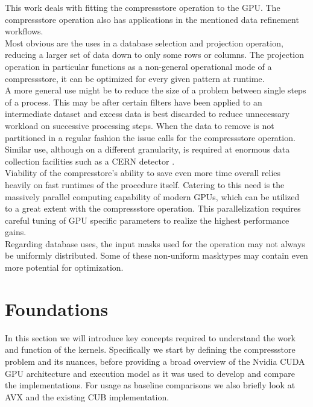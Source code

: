 \documentclass{tudscrreprt}
\begin{document}
		This work deals with fitting the compressstore operation to the GPU. The compressstore operation also has applications in the mentioned data refinement workflows. \\
		
		Most obvious are the uses in a database selection and projection operation, reducing a larger set of data down to only some rows or columns. The projection operation in particular functions as a non-general operational mode of a compressstore, it can be optimized for every given pattern at runtime. \\
		A more general use might be to reduce the size of a problem between single steps of a process. This may be after certain filters have been applied to an intermediate dataset and excess data is best discarded to reduce unnecessary workload on successive processing steps. When the data to remove is not partitioned in a regular fashion the issue calls for the compressstore operation. \\
		Similar use, although on a different granularity, is required at enormous data collection facilities such as a CERN detector \cite{cern_datastreaming}. \\
		
		Viability of the compresstore's ability to save even more time overall relies heavily on fast runtimes of the procedure itself. Catering to this need is the massively parallel computing capability of modern GPUs, which can be utilized to a great extent with the compressstore operation. This parallelization requires careful tuning of GPU specific parameters to realize the highest performance gains. \\
		
		Regarding database uses, the input masks used for the operation may not always be uniformly distributed. Some of these non-uniform masktypes may contain even more potential for optimization. \\
		
	\chapter{Foundations}
		In this section we will introduce key concepts required to understand the work and function of the kernels. Specifically we start by defining the compressstore problem and its nuances, before providing a broad overview of the Nvidia CUDA GPU architecture and execution model as it was used to develop and compare the implementations. For usage as baseline comparisons we also briefly look at AVX and the existing CUB implementation.
	
\end{document}
